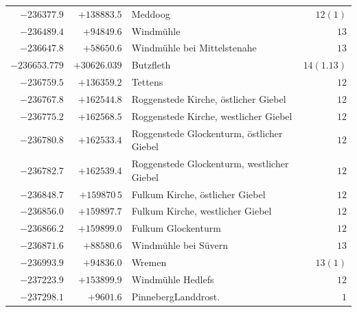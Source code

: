 \begin{center}
\begin{tabular}{r|r|p{170pt}|r}
\(-236377.9\)&\(+138883.5\)&Meddoog&\(12(1)\)\\
\(-236489.4\)&\(+94849.6\)&Windmühle&\(13\)\\
\(-236647.8\)&\(+58650.6\)&Windmühle bei Mittelstenahe&\(13\)\\
\(-236653.779\)&\(+30626.039\)&Butzfleth&\(14(1.13)\)\\
\(-236759.5\)&\(+136359.2\)&Tettens&\(12\)\\
\(-236767.8\)&\(+162544.8\)&Roggenstede Kirche, östlicher Giebel&\(12\)\\
\(-236775.2\)&\(+162568.5\)&Roggenstede Kirche, westlicher Giebel&\(12\)\\
\(-236780.8\)&\(+162533.4\)&Roggenstede Glockenturm, östlicher Giebel&\(12\)\\
\(-236782.7\)&\(+162539.4\)&Roggenstede Glockenturm, westlicher Giebel&\(12\)\\
\(-236848.7\)&\(+159870\,5\)&Fulkum Kirche, östlicher Giebel&\(12\)\\
\(-236856.0\)&\(+159897.7\)&Fulkum Kirche, westlicher Giebel&\(12\)\\
\(-236866.2\)&\(+159899.0\)&Fulkum Glockenturm&\(12\)\\
\(-236871.6\)&\(+88580.6\)&Windmühle bei Süvern&\(13\)\\
\(-236993.9\)&\(+94836.0\)&Wremen&\(13(1)\)\\
\(-237223.9\)&\(+153899.9\)&Windmühle Hedlefs&\(12\)\\
\(-237298.1\)&\(+9601.6\)&PinnebergLanddrost.&\(1\)\\
\hline\end{tabular}\endgroup\end{center}
